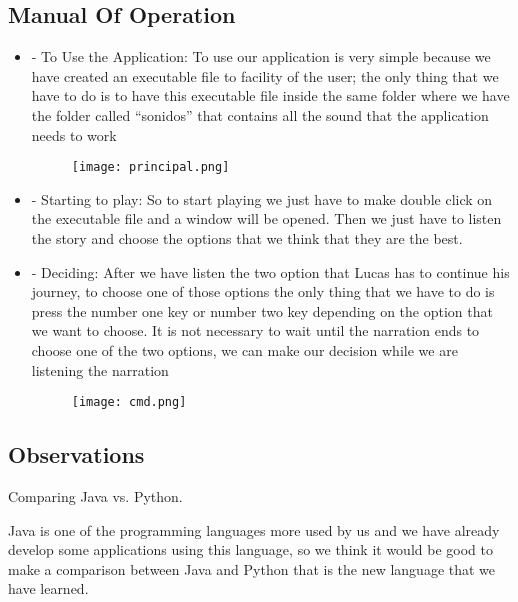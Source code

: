 \documentclass[12pt,letterpaper]{article}
\begin{document}
\subsection{Manual Of Operation}
\begin{itemize}
\item - To Use the Application: To use our application is very simple because we have created an executable file to facility of the user; the only thing that we have to do is to have this executable file inside the same folder where we have the folder called “sonidos” that contains all the sound that the application needs to work

\begin{figure}[h]
\begin{center}
\texttt{[image: principal.png]}\\
\end{center}
\end{figure}

\item - Starting to play: So to start playing we just have to make double click on the executable file and a window will be opened. Then we just have to listen the story and choose the options that we think that they are the best.

\item - Deciding: After we have listen the two option that Lucas has to continue his journey, to choose one of those options the only thing that we have to do is press the number one key or number two key depending on the option that we want to choose.
It is not necessary to wait until the narration ends to choose one of the two options, we can make our decision while we are listening the narration

\begin{figure}[h]
\begin{center}
\texttt{[image: cmd.png]}\\
\end{center}
\end{figure}

\end{itemize}

\subsection{Observations}

Comparing Java vs. Python.
\begin{raggedleft}
Java is one of the programming languages more used by us and we have already develop some applications using this language, so we think it would be good to make a comparison between Java and Python that is the new language that we have learned.
\end{raggedleft}
\end{document}
